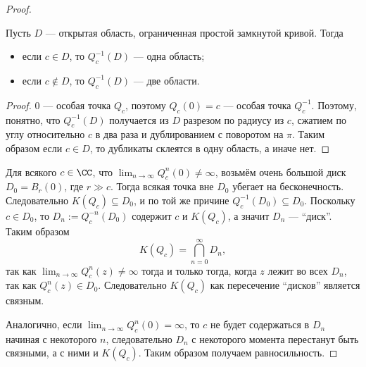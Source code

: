 \documentclass[12pt,a4paper]{article}
\begin{document}
    \begin{proof}
        \begin{thlemma}
            Пусть $D$ --- открытая область, ограниченная простой замкнутой кривой. Тогда
            \begin{itemize}
                \item если $c \in D$, то $Q_c^{-1}(D)$ --- одна область;
                \item если $c \notin D$, то $Q_c^{-1}(D)$ --- две области.
            \end{itemize}
        \end{thlemma}
    
        \begin{proof}
            $0$ --- особая точка $Q_c$, поэтому $Q_c(0) = c$ --- особая точка $Q_c^{-1}$. Поэтому, понятно, что $Q_c^{-1}(D)$ получается из $D$ разрезом по радиусу из $c$, сжатием по углу относительно $c$ в два раза и дублированием с поворотом на $\pi$. Таким образом если $c \in D$, то дубликаты склеятся в одну область, а иначе нет.
        \end{proof}

        Для всякого $c \in \CC$, что $\lim_{n \to \infty} Q_c^{n}(0) \neq \infty$, возьмём очень большой диск $D_0 = B_r(0)$, где $r \gg c$. Тогда всякая точка вне $D_0$ убегает на бесконечность. Следовательно $K(Q_c) \subseteq D_0$, и по той же причине $Q_c^{-1}(D_0) \subseteq D_0$. Поскольку $c \in D_0$, то $D_n := Q_c^{-n}(D_0)$ содержит $c$ и $K(Q_c)$, а значит $D_n$ --- ``диск''. Таким образом
        \[K(Q_c) = \bigcap_{n=0}^\infty D_n,\]
        так как $\lim_{n \to \infty} Q_c^{n}(z) \neq \infty$ тогда и только тогда, когда $z$ лежит во всех $D_n$, так как $Q_c^{n}(z) \in D_0$. Следовательно $K(Q_c)$ как пересечение ``дисков'' является связным.
        
        Аналогично, если $\lim_{n \to \infty} Q_c^{n}(0) = \infty$, то $c$ не будет содержаться в $D_n$ начиная с некоторого $n$, следовательно $D_n$ с некоторого момента перестанут быть связными, а с ними и $K(Q_c)$. Таким образом получаем равносильность.
    \end{proof}
\end{document}
